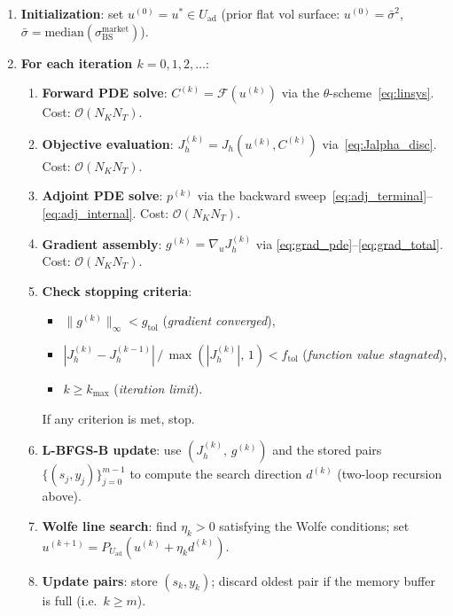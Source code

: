 \documentclass[11pt, a4paper]{article}
\newcommand{\Fop}{\mathcal{F}}          %
\theoremstyle{definition}
\theoremstyle{plain}
\begin{document}
\begin{enumerate}
  \item \textbf{Initialization}: set $u^{(0)} = u^* \in U_\text{ad}$
        (prior flat vol surface: $u^{(0)} = \bar{\sigma}^2$,
        $\bar{\sigma} = \text{median}(\sigma_\text{BS}^{\text{market}})$).
  \item \textbf{For each iteration $k = 0, 1, 2, \ldots$}:
    \begin{enumerate}
      \item \textbf{Forward PDE solve}: $C^{(k)} = \Fop(u^{(k)})$
            via the $\theta$-scheme~\eqref{eq:linsys}.
            Cost: $\mathcal{O}(N_K N_T)$.
      \item \textbf{Objective evaluation}: $J_h^{(k)} = J_h(u^{(k)}, C^{(k)})$
            via~\eqref{eq:Jalpha_disc}. Cost: $\mathcal{O}(N_K N_T)$.
      \item \textbf{Adjoint PDE solve}: $p^{(k)}$ via the backward
            sweep~\eqref{eq:adj_terminal}--\eqref{eq:adj_internal}.
            Cost: $\mathcal{O}(N_K N_T)$.
      \item \textbf{Gradient assembly}: $g^{(k)} = \nabla_u J_h^{(k)}$ via
            \eqref{eq:grad_pde}--\eqref{eq:grad_total}.
            Cost: $\mathcal{O}(N_K N_T)$.
      \item \textbf{Check stopping criteria}:
            \begin{itemize}
              \item $\|g^{(k)}\|_\infty < g_\text{tol}$ \quad (\emph{gradient converged}),
              \item $|J_h^{(k)} - J_h^{(k-1)}| \,/\, \max(|J_h^{(k)}|,\,1) < f_\text{tol}$
                    \quad (\emph{function value stagnated}),
              \item $k \geq k_{\max}$ \quad (\emph{iteration limit}).
            \end{itemize}
            If any criterion is met, stop.
      \item \textbf{L-BFGS-B update}: use $(J_h^{(k)},\, g^{(k)})$ and the
            stored pairs $\{(s_j, y_j)\}_{j=0}^{m-1}$ to compute the search
            direction $d^{(k)}$ (two-loop recursion above).
      \item \textbf{Wolfe line search}: find $\eta_k > 0$ satisfying the
            Wolfe conditions; set $u^{(k+1)} = P_{U_\text{ad}}(u^{(k)} + \eta_k d^{(k)})$.
      \item \textbf{Update pairs}: store $(s_k, y_k)$; discard oldest pair
            if the memory buffer is full (i.e.\ $k \geq m$).
    \end{enumerate}
\end{enumerate}
\end{document}
